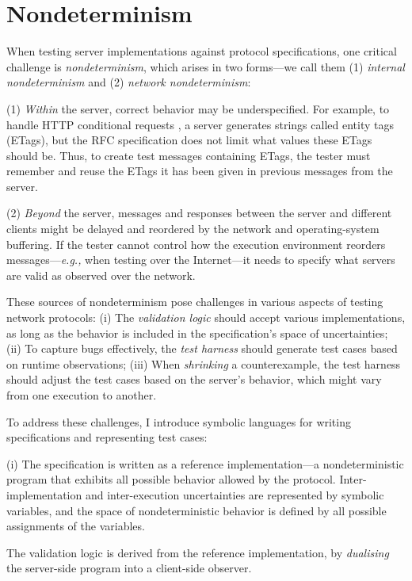 \section{Nondeterminism}

When testing server implementations against protocol specifications, one
critical challenge is {\em nondeterminism}, which arises in two forms---we call
them (1) {\em internal nondeterminism} and (2) {\em network nondeterminism}:

(1) {\em Within} the server, correct behavior may be \mbox{underspecified}.
For example, to handle HTTP conditional requests \cite{rfc7232}, a server
generates strings called entity tags (ETags), but the RFC specification does
not limit {what} values these ETags should be.  Thus, to create test
messages containing ETags, the tester must remember and reuse the ETags it
has been given in previous messages from the server.

(2) {\em Beyond} the server, messages and responses between the server and
different clients might be delayed and reordered by the network and
operating-system buffering.  If the tester cannot control how the execution
environment reorders messages---{\it e.g.,} when testing over the Internet---it
needs to specify what servers are valid as observed over the network.

These sources of nondeterminism pose challenges in various aspects of testing network
protocols: (i) The {\em validation logic} should accept various implementations,
as long as the behavior is included in the specification's space of
uncertainties; (ii) To capture bugs effectively, the {\em test harness} should
generate test cases based on runtime observations; (iii) When {\em shrinking} a
counterexample, the test harness should adjust the test cases based on the
server's behavior, which might vary from one execution to another.

To address these challenges, I introduce symbolic languages for writing
specifications and representing test cases:

(i) The specification is written as a reference implementation---a
nondeterministic program that exhibits all possible behavior allowed by
the protocol.  Inter-implementation and inter-execution uncertainties are
represented by symbolic variables, and the space of nondeterministic behavior is
defined by all possible assignments of the variables.

The validation logic is derived from the reference implementation, by {\em
  dualising} the server-side program into a client-side observer.

